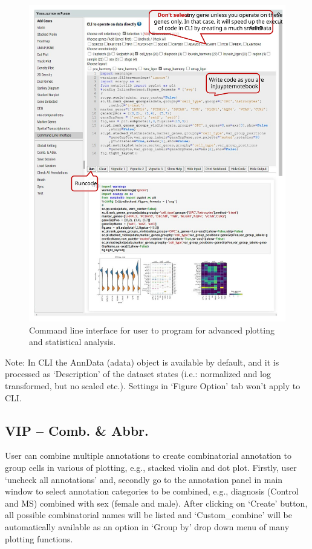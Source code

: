 \documentclass[
]{article}
\begin{document}
\begin{figure}
\centering
\includegraphics{figures/F23_label.svg}
\caption{Command line interface for user to program for advanced plotting and statistical analysis.}
\end{figure}

Note: In CLI the AnnData (adata) object is available by default, and it is processed as `Description' of the dataset states (i.e.: normalized and log transformed, but no scaled etc.). Settings in `Figure Option' tab won't apply to CLI.

\hypertarget{vip-comb.-abbr.}{%
\subsection{VIP -- Comb. \& Abbr.}\label{vip-comb.-abbr.}}

User can combine multiple annotations to create combinatorial annotation to group cells in various of plotting, e.g., stacked violin and dot plot. Firstly, user `uncheck all annotations' and, secondly go to the annotation panel in main window to select annotation categories to be combined, e.g., diagnosis (Control and MS) combined with sex (female and male). After clicking on `Create' button, all possible combinatorial names will be listed and `Custom\_combine' will be automatically available as an option in `Group by' drop down menu of many plotting functions.
\end{document}
